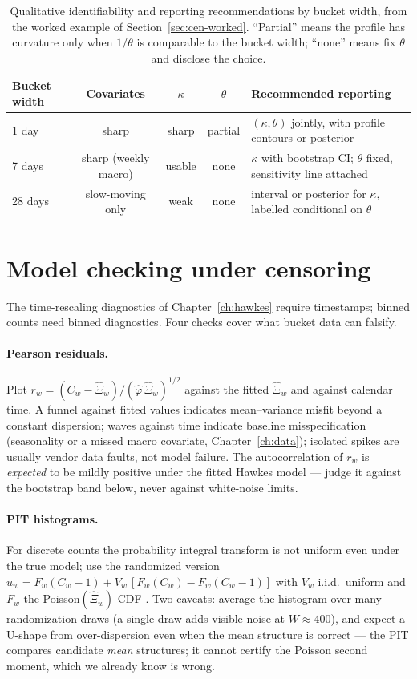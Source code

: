 \begin{table}[htbp]
\centering
\small
\begin{tabular}{lcccp{4.2cm}}
\toprule
Bucket width & Covariates & $\kappa$ & $\theta$ & Recommended reporting \\
\midrule
1 day & sharp & sharp & partial & $(\kappa,\theta)$ jointly, with profile contours or
posterior \\
7 days & sharp (weekly macro) & usable & none & $\kappa$ with bootstrap CI; $\theta$
fixed, sensitivity line attached \\
28 days & slow-moving only & weak & none & interval or posterior for $\kappa$, labelled
conditional on $\theta$ \\
\bottomrule
\end{tabular}
\caption{Qualitative identifiability and reporting recommendations by bucket width, from
the worked example of Section~\ref{sec:cen-worked}. ``Partial'' means the profile has
curvature only when $1/\theta$ is comparable to the bucket width; ``none'' means fix
$\theta$ and disclose the choice.}
\label{tab:cen-worked}
\end{table}

\section{Model checking under censoring}
\label{sec:cen-check}

The time-rescaling diagnostics of Chapter~\ref{ch:hawkes} require timestamps; binned
counts need binned diagnostics. Four checks cover what bucket data can falsify.

\paragraph{Pearson residuals.}
Plot $r_w = (C_w - \hat\Xi_w)/(\hat\varphi\, \hat\Xi_w)^{1/2}$ against the fitted
$\hat\Xi_w$ and against calendar time. A funnel against fitted values indicates
mean--variance misfit beyond a constant dispersion; waves against time indicate baseline
misspecification (seasonality or a missed macro covariate, Chapter~\ref{ch:data});
isolated spikes are usually vendor data faults, not model failure. The autocorrelation
of $r_w$ is \emph{expected} to be mildly positive under the fitted Hawkes model --- judge
it against the bootstrap band below, never against white-noise limits.

\paragraph{PIT histograms.}
For discrete counts the probability integral transform is not uniform even under the true
model; use the randomized version $u_w = F_w(C_w - 1) + V_w\,[F_w(C_w) - F_w(C_w-1)]$
with $V_w$ i.i.d.\ uniform and $F_w$ the Poisson$(\hat\Xi_w)$ CDF \cite{fokianos2009}.
Two caveats: average the histogram over many randomization draws (a single draw adds
visible noise at $W \approx 400$), and expect a U-shape from over-dispersion even when
the mean structure is correct --- the PIT compares candidate \emph{mean} structures; it
cannot certify the Poisson second moment, which we already know is wrong.

